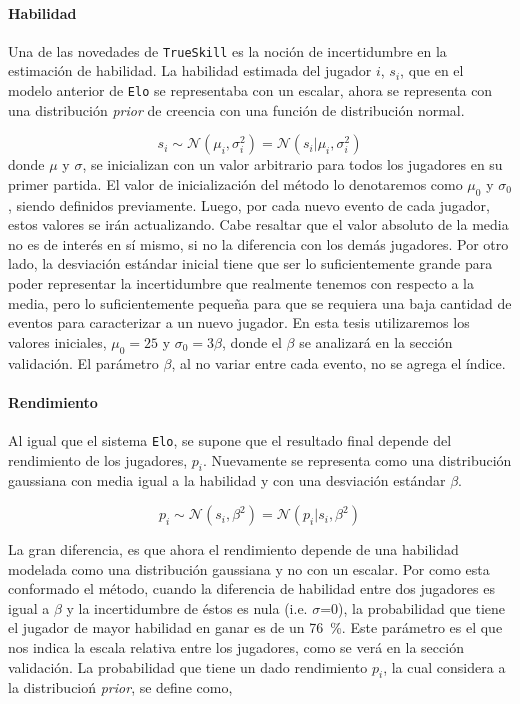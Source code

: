 \documentclass[11pt,twoside,spanish]{report} %
\begin{document}
\paragraph{Habilidad}
Una de las novedades de \texttt{TrueSkill} es la noci\'on de incertidumbre en la estimaci\'on de habilidad.
La habilidad estimada del jugador $i$,  $s_i$, que en el modelo anterior de \texttt{Elo} se representaba con un escalar, ahora se representa con una distribuci\'on \textit{prior} de creencia con una funci\'on de distribuci\'on normal.

\begin{equation}
s_i \sim \mathcal{N}(\mu_i, \sigma_i^2) = \mathcal{N}(s_i|\mu_i, \sigma_i^2)
\end{equation}
donde $\mu$ y $\sigma$, se inicializan con un valor arbitrario para todos los jugadores en su primer partida.
El valor de inicializaci\'on del m\'etodo lo denotaremos como $\mu_0$ y $\sigma_0$, siendo definidos previamente.
Luego, por cada nuevo evento de cada jugador, estos valores se ir\'an actualizando.
Cabe resaltar que el valor absoluto de la media no es de inter\'es en s\'i mismo, si no la diferencia con los dem\'as jugadores.
Por otro lado, la desviaci\'on est\'andar inicial tiene que ser lo suficientemente grande para poder representar la incertidumbre que realmente tenemos con respecto a la media, pero lo suficientemente peque\~na para que se requiera una baja cantidad de eventos para caracterizar a un nuevo jugador.
En esta tesis utilizaremos los valores iniciales, $ \mu_0 = 25 $ y $ \sigma_0=3\beta$, donde el $\beta$ se analizar\'a en la secci\'on validaci\'on.
El par\'ametro $\beta$, al no variar entre cada evento, no se agrega el \'indice.



\paragraph{Rendimiento}
Al igual que el sistema \texttt{Elo}, se supone que el resultado final depende del rendimiento de los jugadores, $p_i$.
Nuevamente se representa como una distribuci\'on gaussiana con media igual a la habilidad y con una desviaci\'on est\'andar $\beta$.

\begin{equation}
p_i \sim \mathcal{N}(s_i, \beta^2) = \mathcal{N}(p_i|s_i, \beta^2)
\end{equation}

La gran diferencia, es que ahora el rendimiento depende de una habilidad modelada como una distribuci\'on gaussiana y no con un escalar.
Por como esta conformado el m\'etodo, cuando la diferencia de habilidad entre dos jugadores es igual a $\beta$ y la incertidumbre de \'estos es nula (i.e. $\sigma$=0), la probabilidad que tiene el jugador de mayor habilidad en ganar es de un \SI{76}{\percent}.
Este par\'ametro es el que nos indica la escala relativa entre los jugadores, como se ver\'a en la secci\'on validaci\'on.
La probabilidad  que tiene un dado rendimiento $p_i$, la cual considera a la distribucio\'n  \textit{prior}, se define como,
\end{document}
